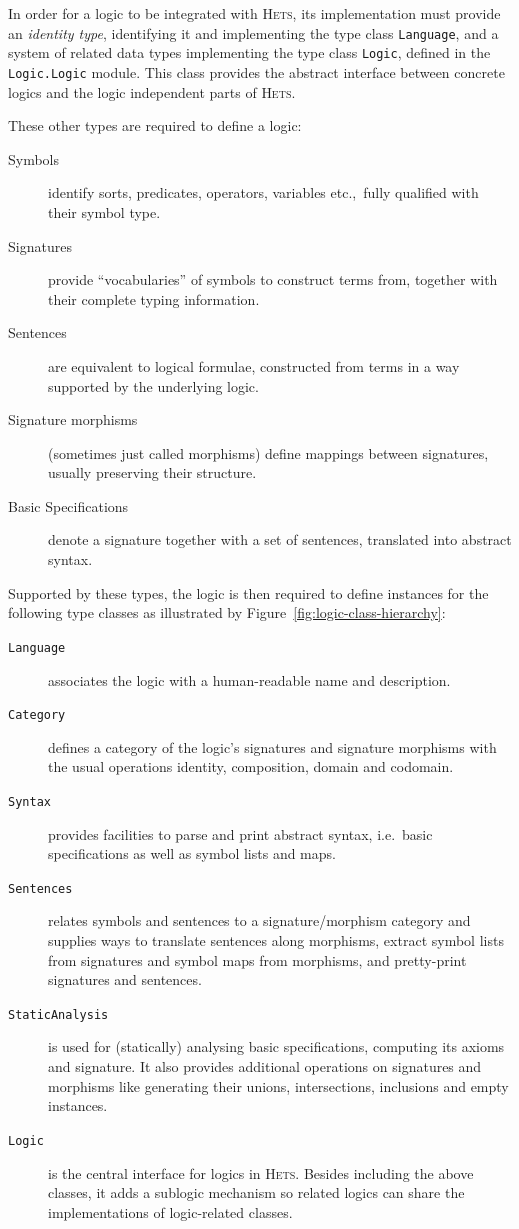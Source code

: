 \documentclass[11pt]{article}
\newcommand{\Hets}{\textsc{Hets}}
\begin{document}
In order for a logic to be integrated with \Hets{}, its implementation must provide an \emph{identity type}, identifying it and implementing the type class \texttt{Language}, and a system of related data types implementing the type class \texttt{Logic}, defined in the \texttt{Logic.Logic} module. This class provides the abstract interface between concrete logics and the logic independent parts of \Hets{}.

These other types are required to define a logic:

\begin{description}
  \item[Symbols] identify sorts, predicates, operators, variables etc.,\ fully qualified with their symbol type.
  \item[Signatures] provide ``vocabularies'' of symbols to construct terms from, together with their complete typing information.
  \item[Sentences] are equivalent to logical formulae, constructed from terms in a way supported by the underlying logic.
  \item[Signature morphisms] (sometimes just called morphisms) define mappings between signatures, usually preserving their structure.
  \item[Basic Specifications] denote a signature together with a set of sentences, translated into abstract syntax.
\end{description}

Supported by these types, the logic is then required to define instances for the following type classes as illustrated by Figure~\ref{fig:logic-class-hierarchy}:

\begin{description}
  \item[\texttt{Language}] associates the logic with a human-readable name and description.
  \item[\texttt{Category}] defines a category of the logic's signatures and signature morphisms with the usual operations identity, composition, domain and codomain.
  \item[\texttt{Syntax}] provides facilities to parse and print abstract syntax, i.e.\ basic specifications as well as symbol lists and maps.
  \item[\texttt{Sentences}] relates symbols and sentences to a signature/morphism category and supplies ways to translate sentences along morphisms, extract symbol lists from signatures and symbol maps from morphisms, and pretty-print signatures and sentences.
  \item[\texttt{StaticAnalysis}] is used for (statically) analysing basic specifications, computing its axioms and signature. It also provides additional operations on signatures and morphisms like generating their unions, intersections, inclusions and empty instances.
  \item[\texttt{Logic}] is the central interface for logics in \Hets{}. Besides including the above classes, it adds a sublogic mechanism so related logics can share the implementations of logic-related classes.
\end{description}
\end{document}
